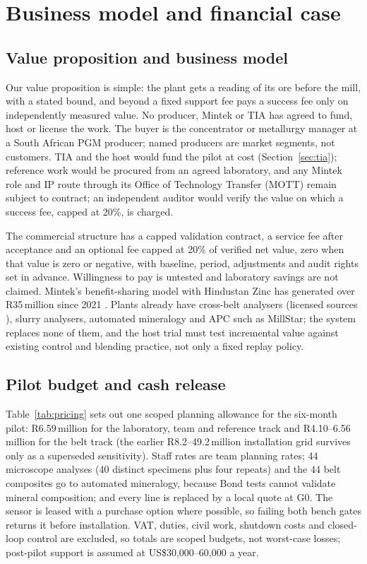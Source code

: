 \documentclass[10pt,a4paper,twocolumn]{article}
\begin{document}
\section{Business model and financial case}\label{sec:business}


\subsection{Value proposition and business model}

Our value proposition is simple: the plant gets a reading of its ore before the mill, with a stated bound, and beyond a fixed support fee pays a success fee only on independently measured value. No producer, Mintek or TIA has agreed to fund, host or license the work. The buyer is the concentrator or metallurgy manager at a South African PGM producer; named producers are market segments, not customers. TIA \cite{tia} and the host would fund the pilot at cost (Section~\ref{sec:tia}); reference work would be procured from an agreed laboratory, and any Mintek role and IP route through its Office of Technology Transfer (MOTT) remain subject to contract; an independent auditor would verify the value on which a success fee, capped at 20\%, is charged.

The commercial structure has a capped validation contract, a service fee after acceptance and an optional fee capped at 20\% of verified net value, zero when that value is zero or negative, with baseline, period, adjustments and audit rights set in advance. Willingness to pay is untested and laboratory savings are not claimed. Mintek's benefit-sharing model with Hindustan Zinc has generated over R35\,million since 2021 \cite{mintek2025}. Plants already have cross-belt analysers (licensed sources \cite{sahpra}), slurry analysers, automated mineralogy and APC such as MillStar; the system replaces none of them, and the host trial must test incremental value against existing control and blending practice, not only a fixed replay policy.

\subsection{Pilot budget and cash release}\label{sec:pricing}

Table~\ref{tab:pricing} sets out one scoped planning allowance for the six-month pilot: R6.59\,million for the laboratory, team and reference track and R4.10--6.56\,million for the belt track (the earlier R8.2--49.2\,million installation grid survives only as a superseded sensitivity). Staff rates are team planning rates; 44 microscope analyses (40 distinct specimens plus four repeats) and the 44 belt composites go to automated mineralogy, because Bond tests cannot validate mineral composition; and every line is replaced by a local quote at G0. The sensor is leased with a purchase option where possible, so failing both bench gates returns it before installation. VAT, duties, civil work, shutdown costs and closed-loop control are excluded, so totals are scoped budgets, not worst-case losses; post-pilot support is assumed at US\$30,000--60,000 a year.
\end{document}

